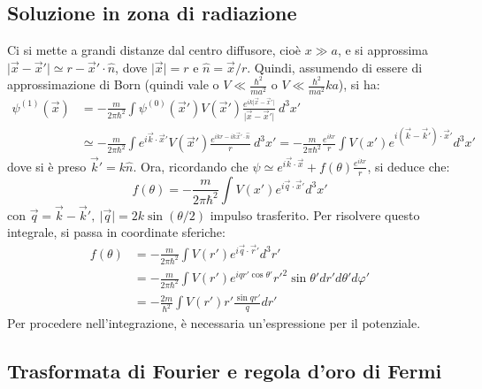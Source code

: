 \documentclass[11pt, a4paper]{scrartcl} %
\numberwithin{equation}{subsection}
\theoremstyle{style2}
\theoremstyle{style1}
\begin{document}
\subsection{Soluzione in zona di radiazione}
Ci si mette a grandi distanze dal centro diffusore, cio\`e $x \gg a$, e si approssima $\lvert \vec{x}- \vec{x}' \rvert \simeq r - \vec{x}' \cdot \hat{n}$, dove $\lvert \vec{x} \rvert = r$ e $\hat{n} = \vec{x} / r$.
Quindi, assumendo di essere di approssimazione di Born (quindi vale o $V \ll \frac{\hbar ^2}{ma^2}$ o $V \ll \frac{\hbar ^2}{ma^2}ka$), si ha:
\[
\begin{split}
	\psi ^{(1)} (\vec{x}) &= -\frac{m}{2\pi \hbar ^2}\int \psi ^{(0)} (\vec{x}') V(\vec{x}') \frac{e^{ik\lvert \vec{x}- \vec{x}' \rvert }}{\lvert \vec{x}-\vec{x}' \rvert } \ d^3 x'\\
	& \simeq - \frac{m}{2\pi \hbar ^2} \int e^{i \vec{k}\cdot \vec{x}'} V(\vec{x}') \frac{e^{ikr - ik \vec{x}' \cdot \hat{n}} }{r} \ d^3 x' = - \frac{m}{2\pi \hbar ^2} \frac{e^{ikr} }{r} \int V (x') e^{i(\vec{k}-\vec{k}') \cdot \vec{x}'}  d^3 x'
\end{split}
\] 
dove si \`e preso $\vec{k}' = k \hat{n}$.
Ora, ricordando che $\psi \simeq e^{i \vec{k}\cdot \vec{x}} + f(\theta ) \frac{e^{ikr} }{r}$, si deduce che:
\begin{equation*}
	f(\theta ) = - \frac{m}{2\pi \hbar ^2}\int V(x') e^{i \vec{q}\cdot \vec{x}'}  d^3 x'
\end{equation*}
con $\vec{q} = \vec{k} - \vec{k}', \ \lvert \vec{q} \rvert = 2k \sin (\theta / 2)$ impulso trasferito.
Per risolvere questo integrale, si passa in coordinate sferiche:
\begin{equation}\label{ampscat1}
	\begin{split}
		f(\theta ) &=- \frac{m}{2\pi \hbar ^2} \int V(r') e^{i \vec{q}\cdot \vec{r}'} d^3 r'\\
			   &= - \frac{m}{2\pi \hbar ^2}\int V(r') e^{iq r' \cos \theta '} r'^2 \sin \theta ' dr' d\theta ' d \varphi '\\
			   &= - \frac{2m}{\hbar ^2} \int V(r') r'\frac{\sin qr'}{q} dr'
	\end{split}
\end{equation}
Per procedere nell'integrazione, \`e necessaria un'espressione per il potenziale.
\subsection{Trasformata di Fourier e regola d'oro di Fermi}
\end{document}
